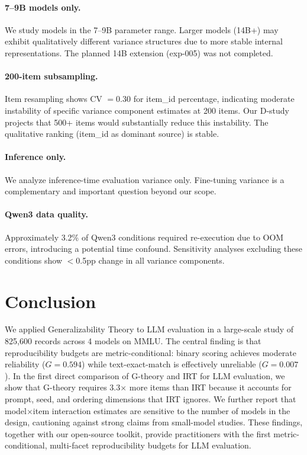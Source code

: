 \documentclass[letterpaper]{article}
\begin{document}
\paragraph{7--9B models only.}
We study models in the 7--9B parameter range. Larger models (14B+) may exhibit qualitatively different variance structures due to more stable internal representations. The planned 14B extension (exp-005) was not completed.

\paragraph{200-item subsampling.}
Item resampling shows CV $= 0.30$ for item\_id percentage, indicating moderate instability of specific variance component estimates at 200 items. Our D-study projects that 500+ items would substantially reduce this instability. The qualitative ranking (item\_id as dominant source) is stable.

\paragraph{Inference only.}
We analyze inference-time evaluation variance only. Fine-tuning variance \citep{dodge2020fine,sellam2022multibertsmultibert} is a complementary and important question beyond our scope.

\paragraph{Qwen3 data quality.}
Approximately 3.2\% of Qwen3 conditions required re-execution due to OOM errors, introducing a potential time confound. Sensitivity analyses excluding these conditions show $<$0.5pp change in all variance components.

\section{Conclusion}

We applied Generalizability Theory to LLM evaluation in a large-scale study of 825,600 records across 4 models on MMLU. The central finding is that reproducibility budgets are metric-conditional: binary scoring achieves moderate reliability ($G = 0.594$) while text-exact-match is effectively unreliable ($G = 0.007$). In the first direct comparison of G-theory and IRT for LLM evaluation, we show that G-theory requires 3.3$\times$ more items than IRT because it accounts for prompt, seed, and ordering dimensions that IRT ignores. We further report that model$\times$item interaction estimates are sensitive to the number of models in the design, cautioning against strong claims from small-model studies. These findings, together with our open-source toolkit, provide practitioners with the first metric-conditional, multi-facet reproducibility budgets for LLM evaluation.
\end{document}
